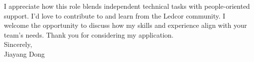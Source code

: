 \documentclass[letterpaper,12pt]{article}
\begin{document}
    I appreciate how this role blends independent technical tasks with people-oriented support. I'd love to contribute to and learn from the Ledcor community. I welcome the opportunity to discuss how my skills and experience align with your team's needs. Thank you for considering my application. \\
    
    Sincerely, \\
    Jiayang Dong 
\end{document}
